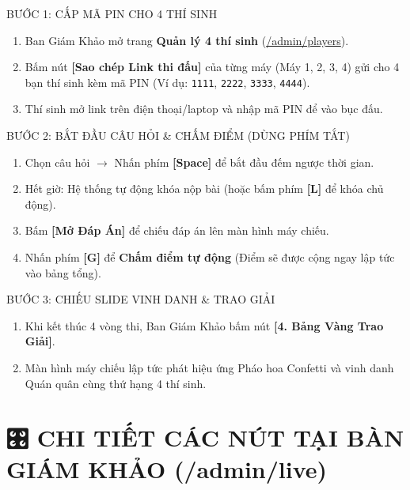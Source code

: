 \documentclass[11pt,a4paper]{article}
\begin{document}
\begin{stepbox}{BƯỚC 1: CẤP MÃ PIN CHO 4 THÍ SINH}
\begin{enumerate}[leftmargin=*]
    \item Ban Giám Khảo mở trang \textbf{Quản lý 4 thí sinh} (\url{/admin/players}).
    \item Bấm nút \textbf{[Sao chép Link thi đấu]} của từng máy (Máy 1, 2, 3, 4) gửi cho 4 bạn thí sinh kèm mã PIN (Ví dụ: \texttt{1111}, \texttt{2222}, \texttt{3333}, \texttt{4444}).
    \item Thí sinh mở link trên điện thoại/laptop và nhập mã PIN để vào bục đấu.
\end{enumerate}
\end{stepbox}

\begin{stepbox}{BƯỚC 2: BẮT ĐẦU CÂU HỎI \& CHẤM ĐIỂM (DÙNG PHÍM TẮT)}
\begin{enumerate}[leftmargin=*]
    \item Chọn câu hỏi $\rightarrow$ Nhấn phím \textbf{[Space]} để bắt đầu đếm ngược thời gian.
    \item Hết giờ: Hệ thống tự động khóa nộp bài (hoặc bấm phím \textbf{[L]} để khóa chủ động).
    \item Bấm \textbf{[Mở Đáp Án]} để chiếu đáp án lên màn hình máy chiếu.
    \item Nhấn phím \textbf{[G]} để \textbf{Chấm điểm tự động} (Điểm sẽ được cộng ngay lập tức vào bảng tổng).
\end{enumerate}
\end{stepbox}

\begin{stepbox}{BƯỚC 3: CHIẾU SLIDE VINH DANH \& TRAO GIẢI}
\begin{enumerate}[leftmargin=*]
    \item Khi kết thúc 4 vòng thi, Ban Giám Khảo bấm nút \textbf{[4. Bảng Vàng Trao Giải]}.
    \item Màn hình máy chiếu lập tức phát hiệu ứng Pháo hoa Confetti và vinh danh Quán quân cùng thứ hạng 4 thí sinh.
\end{enumerate}
\end{stepbox}

\vspace{0.5cm}

\section*{\color{navybg}🎛️ CHI TIẾT CÁC NÚT TẠI BÀN GIÁM KHẢO (/admin/live)}
\end{document}
